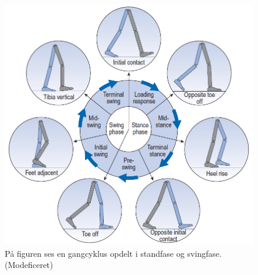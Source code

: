 \begin{figure}[H]
	\centering
	\includegraphics[scale=0.5]{figures/bProblemloesning/gang_cyklus2.png}
	\caption{På figuren ses en gangcyklus opdelt i standfase og svingfase. \citep{Whittle1990} (Modeficeret)}
	\label{fig:gang_cyklus}
\end{figure}
	
